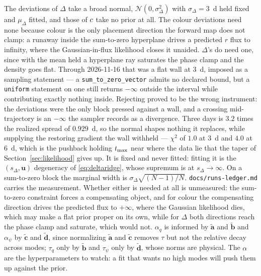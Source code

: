 \documentclass[11pt]{article}
\theoremstyle{plain}
\begin{document}
The deviations of $\Delta$ take a broad normal, $\mathcal{N}(0, \sigma_{\Delta}^{2})$ with
$\sigma_{\Delta} = 3$~d held fixed and $\mu_{\Delta}$ fitted, and those of $c$ take no
prior at all. The colour deviations need none because colour is the only placement direction
the forward map does not clamp: a runaway inside the sum-to-zero hyperplane drives a
predicted $r$ flux to infinity, where the Gaussian-in-flux likelihood closes it unaided.
$\Delta$'s do need one, since with the mean held a hyperplane ray saturates the phase clamp
and the density goes flat. Through 2026-11-16 that was a flat wall at $3$~d, imposed as a
sampling statement --- a \texttt{sum\_to\_zero\_vector} admits no declared bound, but a
\texttt{uniform} statement on one still returns $-\infty$ outside the interval while
contributing exactly nothing inside. Rejecting proved to be the wrong instrument: the
deviations were the only block pressed against a wall, and a crossing mid-trajectory is an
$-\infty$ the sampler records as a divergence. Three days is $3.2$ times the realized spread
of $0.929$~d, so the normal shapes nothing it replaces, while supplying the restoring
gradient the wall withheld --- $\chi^{2}$ of $1.0$ at $3$~d and $4.0$ at $6$~d, which is the
pushback holding $t_{\mathrm{max}}$ near where the data lie that the taper of
Section~\ref{sec:likelihood} gives up. It is fixed and never fitted: fitting it is the
$(s_{\Delta}, \mathbf{u})$ degeneracy of \eqref{eq:deltaridge}, whose supremum is at
$s_{\Delta} \to \infty$. On a sum-to-zero block the marginal width is
$\sigma_{\Delta}\sqrt{(N-1)/N}$. \texttt{docs/runs-ledger.md} carries the measurement.
Whether either is needed at all is unmeasured: the sum-to-zero constraint forces a
compensating object, and for colour the compensating direction drives the predicted flux to
$+\infty$, where the Gaussian likelihood dies, which may make a flat prior proper on its own,
while for $\Delta$ both directions reach the phase clamp and saturate, which would not.
$\alpha_{q}$ is informed by $\tilde{\mathbf{a}}$ and $\tilde{\mathbf{b}}$ and
$\alpha_{\psi}$ by $\tilde{\mathbf{c}}$ and $\tilde{\mathbf{d}}$, since normalizing
$\tilde{\mathbf{a}}$ and $\tilde{\mathbf{c}}$ removes $\tau$ but not the relative decay
across modes; $\tau_{q}$ only by $\tilde{\mathbf{b}}$ and $\tau_{\psi}$ only by
$\tilde{\mathbf{d}}$, whose norms are physical. The $\alpha$ are the hyperparameters to
watch: a fit that wants no high modes will push them up against the prior.
\end{document}
